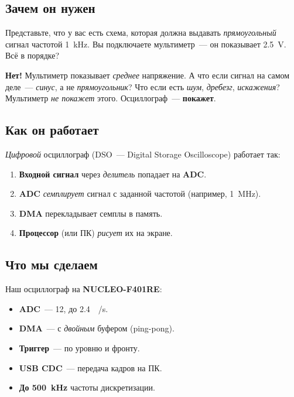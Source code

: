 \subsection{Зачем он нужен}

Представьте, что у вас есть схема, которая должна
выдавать \emph{прямоугольный} сигнал частотой
\SI{1}{\kilo\hertz}. Вы подключаете мультиметр~---
он показывает \SI{2.5}{\volt}. Всё в порядке?

\textbf{Нет!} Мультиметр показывает \emph{среднее}
напряжение. А что если сигнал на самом деле~---
\emph{синус}, а не \emph{прямоугольник}? Что если есть
\emph{шум}, \emph{дребезг}, \emph{искажения}?
Мультиметр \emph{не покажет} этого. Осциллограф~---
\textbf{покажет}.

\subsection{Как он работает}

\emph{Цифровой} осциллограф (DSO~--- Digital Storage
Oscilloscope) работает так:

\begin{enumerate}
    \item \textbf{Входной сигнал} через \emph{делитель}
          попадает на \textbf{ADC}.
    \item \textbf{ADC} \emph{семплирует} сигнал с заданной
          частотой (например, \SI{1}{\mega\hertz}).
    \item \textbf{DMA} перекладывает семплы в память.
    \item \textbf{Процессор} (или ПК) \emph{рисует} их
          на экране.
\end{enumerate}

\subsection{Что мы сделаем}

Наш осциллограф на \textbf{NUCLEO-F401RE}:

\begin{itemize}
    \item \textbf{ADC}~--- \SI{12}{\bit}, до \SI{2.4}{\mega\sample/\second}.
    \item \textbf{DMA}~--- с \emph{двойным} буфером (ping-pong).
    \item \textbf{Триггер}~--- по уровню и фронту.
    \item \textbf{USB CDC}~--- передача кадров на ПК.
    \item \textbf{До \SI{500}{\kilo\hertz}} частоты дискретизации.
\end{itemize}

